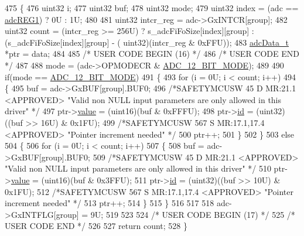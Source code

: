 \begin{DoxyCode}
475 \{
476     uint32  i;
477     uint32  buf;
478     uint32  mode;    
479     uint32  index = (adc == \mbox{\hyperlink{reg__adc_8h_a3b9540af9f841ba3127f14b1c9208c57}{adcREG1}}) ? 0U : 1U;
480 
481     uint32  intcr\_reg = adc->GxINTCR[group];
482     uint32  count = (intcr\_reg >= 256U) ? s\_adcFiFoSize[index][group] : (s\_adcFiFoSize[index][group] - (
      uint32)(intcr\_reg & 0xFFU));
483     \mbox{\hyperlink{structadcData}{adcData\_t}} *ptr = data; 
484 
485 \textcolor{comment}{/* USER CODE BEGIN (16) */}
486 \textcolor{comment}{/* USER CODE END */}
487 
488     mode = (adc->OPMODECR & \mbox{\hyperlink{adc_8h_a15a7481afa59efa27305c6da96ad09b1}{ADC\_12\_BIT\_MODE}});
489 
490     \textcolor{keywordflow}{if}(mode == \mbox{\hyperlink{adc_8h_a15a7481afa59efa27305c6da96ad09b1}{ADC\_12\_BIT\_MODE}})
491       \{
493         \textcolor{keywordflow}{for} (i = 0U; i < count; i++)
494         \{
495           buf        = adc->GxBUF[group].BUF0;
496           \textcolor{comment}{/*SAFETYMCUSW 45 D MR:21.1 <APPROVED> "Valid non NULL input parameters are only allowed in this
       driver" */}
497           ptr->\mbox{\hyperlink{structadcData_a90ab6176c797b3294127cfc83d72b4db}{value}} = (uint16)(buf & 0xFFFU);
498           ptr->\mbox{\hyperlink{structadcData_a17b43632d28d8a5d79a0837796d92790}{id}}    = (uint32)((buf >> 16U) & 0x1FU);
499           \textcolor{comment}{/*SAFETYMCUSW 567 S MR:17.1,17.4 <APPROVED> "Pointer increment needed" */}
500           ptr++;
501         \}
502       \}
503       \textcolor{keywordflow}{else}
504       \{
506         \textcolor{keywordflow}{for} (i = 0U; i < count; i++)
507         \{
508           buf        = adc->GxBUF[group].BUF0;
509           \textcolor{comment}{/*SAFETYMCUSW 45 D MR:21.1 <APPROVED> "Valid non NULL input parameters are only allowed in this
       driver" */}
510           ptr->\mbox{\hyperlink{structadcData_a90ab6176c797b3294127cfc83d72b4db}{value}} = (uint16)(buf & 0x3FFU);
511           ptr->\mbox{\hyperlink{structadcData_a17b43632d28d8a5d79a0837796d92790}{id}}    = (uint32)((buf >> 10U) & 0x1FU);
512           \textcolor{comment}{/*SAFETYMCUSW 567 S MR:17.1,17.4 <APPROVED> "Pointer increment needed" */}
513           ptr++;
514         \}
515       \}
516 
517 
518     adc->GxINTFLG[group] = 9U;
519 
523 
524 \textcolor{comment}{/* USER CODE BEGIN (17) */}
525 \textcolor{comment}{/* USER CODE END */}
526 
527     \textcolor{keywordflow}{return} count;
528 \}
\end{DoxyCode}
\mbox{\label{group__ADC_ga0e44b7ecaee5bf23d1653da2ac80fe33}} 
